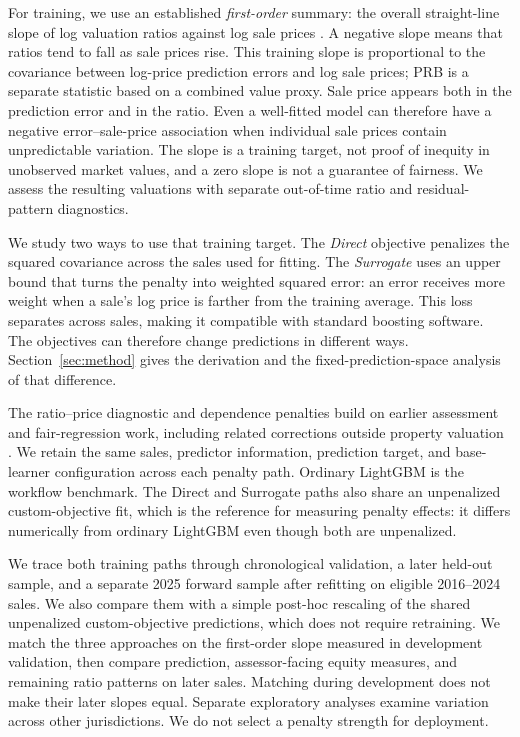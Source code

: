 \documentclass[10pt]{article}
\theoremstyle{definition}
\newcommand{\1}{\mathbf{1}}
\begin{document}
For training, we use an established \emph{first-order} summary: the overall straight-line slope of log valuation ratios against log sale prices \cite{Cheng1974}. A negative slope means that ratios tend to fall as sale prices rise. This training slope is proportional to the covariance between log-price prediction errors and log sale prices; PRB is a separate statistic based on a combined value proxy. Sale price appears both in the prediction error and in the ratio. Even a well-fitted model can therefore have a negative error--sale-price association when individual sale prices contain unpredictable variation. The slope is a training target, not proof of inequity in unobserved market values, and a zero slope is not a guarantee of fairness. We assess the resulting valuations with separate out-of-time ratio and residual-pattern diagnostics.

We study two ways to use that training target. The \emph{Direct} objective penalizes the squared covariance across the sales used for fitting. The \emph{Surrogate} uses an upper bound that turns the penalty into weighted squared error: an error receives more weight when a sale's log price is farther from the training average. This loss separates across sales, making it compatible with standard boosting software. The objectives can therefore change predictions in different ways. Section~\ref{sec:method} gives the derivation and the fixed-prediction-space analysis of that difference.

The ratio--price diagnostic and dependence penalties build on earlier assessment and fair-regression work, including related corrections outside property valuation \cite{Cheng1974,KomiyamaEtAl2018,TrederEtAl2021}. We retain the same sales, predictor information, prediction target, and base-learner configuration across each penalty path. Ordinary LightGBM is the workflow benchmark. The Direct and Surrogate paths also share an unpenalized custom-objective fit, which is the reference for measuring penalty effects: it differs numerically from ordinary LightGBM even though both are unpenalized.

We trace both training paths through chronological validation, a later held-out sample, and a separate 2025 forward sample after refitting on eligible 2016--2024 sales. We also compare them with a simple post-hoc rescaling of the shared unpenalized custom-objective predictions, which does not require retraining. We match the three approaches on the first-order slope measured in development validation, then compare prediction, assessor-facing equity measures, and remaining ratio patterns on later sales. Matching during development does not make their later slopes equal. Separate exploratory analyses examine variation across other jurisdictions. We do not select a penalty strength for deployment.
\end{document}
